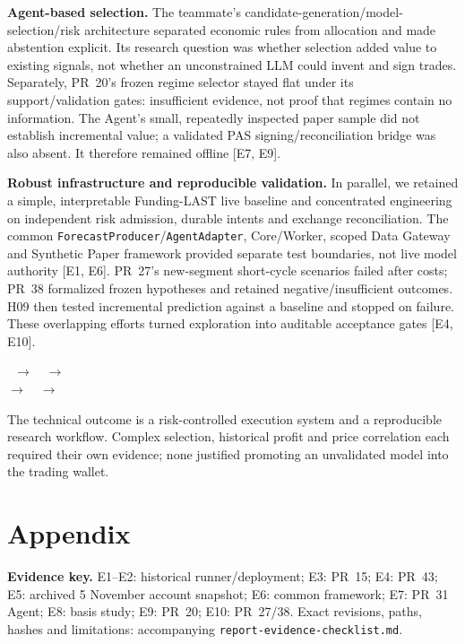 \documentclass[a4paper]{article}
\begin{document}
\textbf{Agent-based selection.} The teammate's candidate-generation/model-selection/risk architecture separated economic rules from allocation and made abstention explicit. Its research question was whether selection added value to existing signals, not whether an unconstrained LLM could invent and sign trades. Separately, PR~20's frozen regime selector stayed flat under its support/validation gates: insufficient evidence, not proof that regimes contain no information. The Agent's small, repeatedly inspected paper sample did not establish incremental value; a validated PAS signing/reconciliation bridge was also absent. It therefore remained offline [E7, E9].

\textbf{Robust infrastructure and reproducible validation.} In parallel, we retained a simple, interpretable Funding-LAST live baseline and concentrated engineering on independent risk admission, durable intents and exchange reconciliation. The common \texttt{ForecastProducer}/\texttt{AgentAdapter}, Core/Worker, scoped Data Gateway and Synthetic Paper framework provided separate test boundaries, not live model authority [E1, E6]. PR~27's new-segment short-cycle scenarios failed after costs; PR~38 formalized frozen hypotheses and retained negative/insufficient outcomes. H09 then tested incremental prediction against a baseline and stopped on failure. These overlapping efforts turned exploration into auditable acceptance gates [E4, E10].

\begin{center}\small
{}\ $\longrightarrow$\ \ $\longrightarrow$\ \\[2mm]
\hspace*{8mm}$\longrightarrow$\ \ $\longrightarrow$\ 
\end{center}
The technical outcome is a risk-controlled execution system and a reproducible research workflow. Complex selection, historical profit and price correlation each required their own evidence; none justified promoting an unvalidated model into the trading wallet.

\appendix
\section{Appendix}
\small
\textbf{Evidence key.} E1--E2: historical runner/deployment; E3: PR~15; E4: PR~43; E5: archived 5 November account snapshot; E6: common framework; E7: PR~31 Agent; E8: basis study; E9: PR~20; E10: PR~27/38. Exact revisions, paths, hashes and limitations: accompanying \texttt{report-evidence-checklist.md}.
\end{document}
